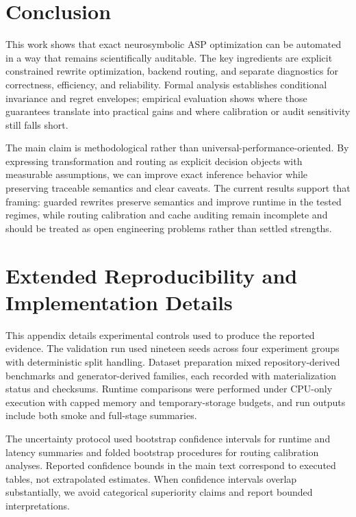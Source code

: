 \documentclass{article} %
\begin{document}
\section{Conclusion}
\label{sec:conclusion}
This work shows that exact neurosymbolic ASP optimization can be automated in a way that remains scientifically auditable. The key ingredients are explicit constrained rewrite optimization, backend routing, and separate diagnostics for correctness, efficiency, and reliability. Formal analysis establishes conditional invariance and regret envelopes; empirical evaluation shows where those guarantees translate into practical gains and where calibration or audit sensitivity still falls short.

The main claim is methodological rather than universal-performance-oriented. By expressing transformation and routing as explicit decision objects with measurable assumptions, we can improve exact inference behavior while preserving traceable semantics and clear caveats. The current results support that framing: guarded rewrites preserve semantics and improve runtime in the tested regimes, while routing calibration and cache auditing remain incomplete and should be treated as open engineering problems rather than settled strengths.

\clearpage{}\label{sec:end_of_main}






\appendix
\clearpage{}\label{sec:appendix_start}

\section{Extended Reproducibility and Implementation Details}
\label{sec:app_repro}
This appendix details experimental controls used to produce the reported evidence. The validation run used nineteen seeds across four experiment groups with deterministic split handling. Dataset preparation mixed repository-derived benchmarks and generator-derived families, each recorded with materialization status and checksums. Runtime comparisons were performed under CPU-only execution with capped memory and temporary-storage budgets, and run outputs include both smoke and full-stage summaries.

The uncertainty protocol used bootstrap confidence intervals for runtime and latency summaries and folded bootstrap procedures for routing calibration analyses. Reported confidence bounds in the main text correspond to executed tables, not extrapolated estimates. When confidence intervals overlap substantially, we avoid categorical superiority claims and report bounded interpretations.
\end{document}
